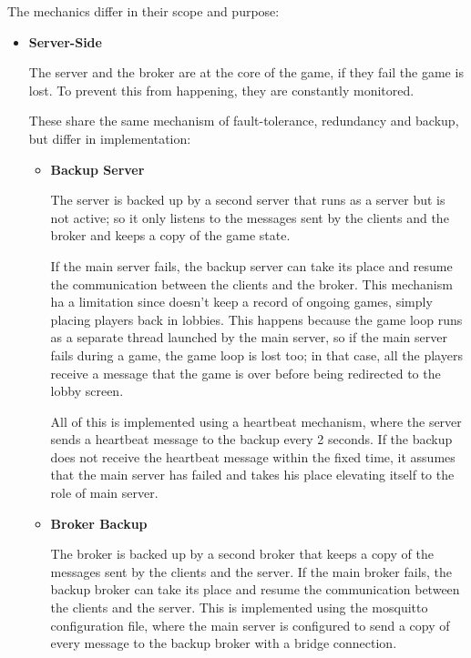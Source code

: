 \documentclass{scrartcl}
\begin{document}
The mechanics differ in their scope and purpose:
\begin{itemize}
      \item
            \textbf{Server-Side} \par
            The server and the broker are at the core of the game, if they fail the game is lost.
            To prevent this from happening, they are constantly monitored.

            These share the same mechanism of fault-tolerance, redundancy and backup,
            but differ in implementation:

            \begin{itemize}
                  \item \textbf{Backup Server} \par
                        The server is backed up by a second server that runs as a server but is
                        not active; so it only listens to the messages sent by the clients and the broker 
                        and keeps a copy of the game state.

                        If the main server fails, the backup server can take its place and resume 
                        the communication between the clients and the broker. This mechanism ha a limitation
                        since doesn't keep a record of ongoing games, simply placing players back in lobbies.
                        This happens because the game loop runs as a separate thread launched by 
                        the main server, so if the main server fails during a game, the game loop 
                        is lost too; in that case, all the players receive a message that the 
                        game is over before being redirected to the lobby screen.

                        All of this is implemented using a heartbeat mechanism, where the server sends a 
                        heartbeat message to the backup every 2 seconds. If the backup does not 
                        receive the heartbeat message within the fixed time, it assumes that 
                        the main server has failed and takes his place elevating itself to the role of 
                        main server.
                  \item \textbf{Broker Backup} \par
                        The broker is backed up by a second broker that keeps a copy of the messages 
                        sent by the clients and the server.
                        If the main broker fails, the backup broker can take its place and resume 
                        the communication between the clients and the server.
                        This is implemented using the mosquitto configuration file, where the main 
                        server is configured to send a copy of every message to the backup broker 
                        with a bridge connection.


\end{itemize}
\end{itemize}
\end{document}
